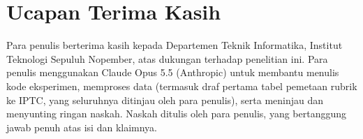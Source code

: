 \documentclass[journal]{IEEEtran}
\begin{document}
\begin{table}[!t]
\caption{Licenses of the Assets Used and Released}
\label{tab:license}
\centering
\footnotesize
\setlength{\tabcolsep}{3pt}
\end{table}

\section*{Ucapan Terima Kasih}
Para penulis berterima kasih kepada Departemen Teknik Informatika, Institut Teknologi Sepuluh Nopember, atas dukungan terhadap penelitian ini. Para penulis menggunakan Claude Opus 5.5 (Anthropic) untuk membantu menulis kode eksperimen, memproses data (termasuk draf pertama tabel pemetaan rubrik ke IPTC, yang seluruhnya ditinjau oleh para penulis), serta meninjau dan menyunting ringan naskah. Naskah ditulis oleh para penulis, yang bertanggung jawab penuh atas isi dan klaimnya.



\end{document}
